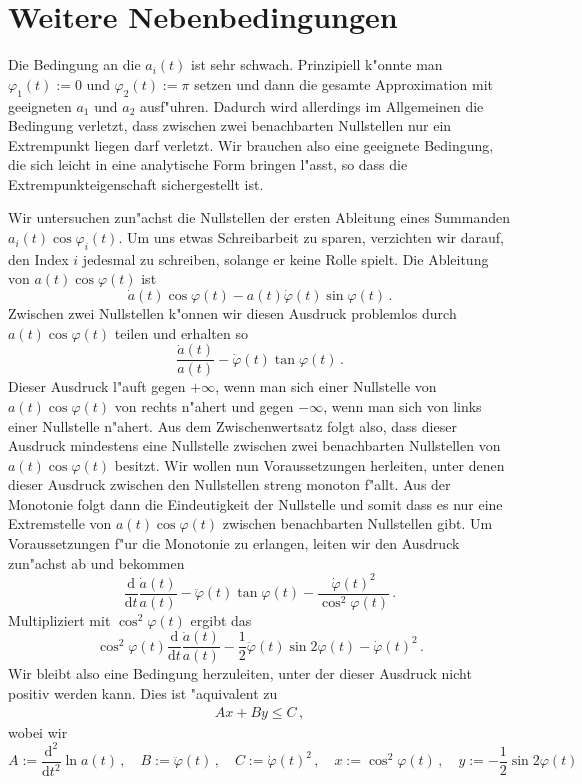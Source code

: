 \documentclass[a4paper]{scrartcl}
\newcommand{\de}{{\mathrm{d}}}
\newcommand{\pphi}{{\varphi}}
\begin{document}
\section{Weitere Nebenbedingungen} \label{sec:moreconds}

Die Bedingung an die $a_i(t)$ ist sehr schwach. Prinzipiell k"onnte man $\pphi_1(t):=0$ und $\pphi_2(t):=\pi$ setzen und dann die gesamte Approximation mit geeigneten $a_1$ und $a_2$ ausf"uhren. Dadurch wird allerdings im Allgemeinen die Bedingung verletzt, dass zwischen zwei benachbarten Nullstellen nur ein Extrempunkt liegen darf verletzt. Wir brauchen also eine geeignete Bedingung, die sich leicht in eine analytische Form bringen l"asst, so dass die Extrempunkteigenschaft sichergestellt ist. 

Wir untersuchen zun"achst die Nullstellen der ersten Ableitung eines Summanden $a_i(t)\cos\pphi_i(t)$. Um uns etwas Schreibarbeit zu sparen, verzichten wir darauf, den Index $i$ jedesmal zu schreiben, solange er keine Rolle spielt. Die Ableitung von $a(t)\cos\pphi(t)$ ist
$$ \dot a(t)\cos\pphi(t)-a(t)\dot\pphi(t)\sin\pphi(t)\,. $$
Zwischen zwei Nullstellen k"onnen wir diesen Ausdruck problemlos durch $a(t)\cos\pphi(t)$ teilen und erhalten so
$$ \frac{\dot a(t)}{a(t)}
-\dot\pphi(t)\tan\pphi(t)\,. $$
Dieser Ausdruck l"auft gegen $+\infty$, wenn man sich einer Nullstelle von $a(t)\cos\pphi(t)$ von rechts n"ahert und gegen $-\infty$, wenn man sich von links einer Nullstelle n"ahert. Aus dem Zwischenwertsatz folgt also, dass dieser Ausdruck mindestens eine Nullstelle zwischen zwei benachbarten Nullstellen von $a(t)\cos\pphi(t)$ besitzt. Wir wollen nun Voraussetzungen herleiten, unter denen dieser Ausdruck zwischen den Nullstellen streng monoton f"allt. Aus der Monotonie folgt dann die Eindeutigkeit der Nullstelle und somit dass es nur eine Extremstelle von $a(t)\cos\pphi(t)$ zwischen benachbarten Nullstellen gibt. Um Voraussetzungen f"ur die Monotonie zu erlangen, leiten wir den Ausdruck zun"achst ab und bekommen
$$ \frac{\de}{\de t}\frac{\dot a(t)}{a(t)}
-\ddot\pphi(t)\tan\pphi(t)
-\frac{\dot\pphi(t)^2}{\cos^2\pphi(t)}\,. $$
Multipliziert mit $\cos^2\pphi(t)$ ergibt das
$$ \cos^2\pphi(t)\frac{\de}{\de t}\frac{\dot a(t)}{a(t)}
-\frac12\ddot\pphi(t)\sin 2\pphi(t)
-\dot\pphi(t)^2\,. $$
Wir bleibt also eine Bedingung herzuleiten, unter der dieser Ausdruck nicht positiv werden kann. Dies ist "aquivalent zu
\begin{align} \label{eq:AxByC}
  Ax + By \le C\,,
\end{align}
wobei wir 
$$ 
A:=\frac{\de^2}{\de t^2}\ln a(t)\,, \quad
B:=\ddot\pphi(t)\,, \quad
C:=\dot\pphi(t)^2\,, \quad
x:=\cos^2\pphi(t)\,, \quad
y:=-\frac12\sin2\pphi(t) $$
\end{document}
